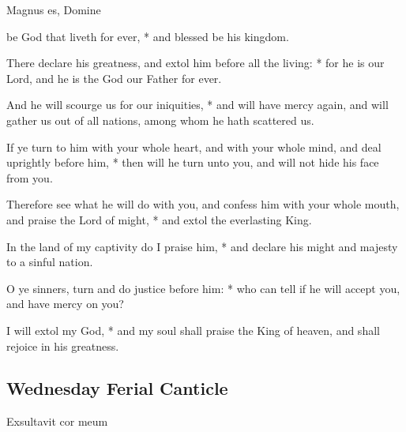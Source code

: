 \begin{multicols}{2}
\begin{inhead}
Magnus es, Domine
\end{inhead}

 be God that liveth for ever, * and blessed be his kingdom.\par
{}
There declare his greatness, and extol him before all the living: * for he is our Lord, and he is the God our Father for ever.\par
And he will scourge us for our iniquities, * and will have mercy again, and will gather us out of all nations, among whom he hath scattered us.\par
If ye turn to him with your whole heart, and with your whole mind, {\dag} and deal uprightly before him, * then will he turn unto you, and will not hide his face from you.\par
Therefore see what he will do with you, and confess him with your whole mouth, and praise the Lord of might, * and extol the everlasting King.\par
In the land of my captivity do I praise him, * and declare his might and majesty to a sinful nation.\par
O ye sinners, turn and do justice before him: * who can tell if he will accept you, and have mercy on you?\par
I will extol my God, * and my soul shall praise the King of heaven, and shall rejoice in his greatness.

\subsection{Wednesday Ferial Canticle}

\begin{inhead}
Exsultavit cor meum
\end{inhead}


\end{multicols}
